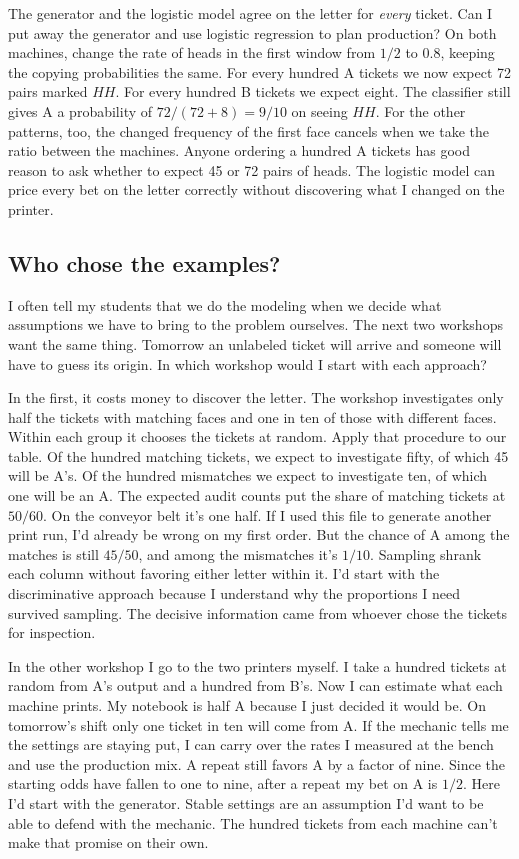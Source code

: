 \documentclass[12pt,oneside]{article}
\newcommand{\secao}[1]{\Needspace{5.2\baselineskip}\subsection*{#1}}
\newcommand{\bookanchor}[1]{\phantomsection\label{#1}}
\begin{document}
The generator and the logistic model agree on the letter for \emph{every} ticket. Can I put away the generator and use logistic regression to plan production? On both machines, change the rate of heads in the first window from $1/2$ to $0.8$, keeping the copying probabilities the same. For every hundred A tickets we now expect 72 pairs marked $HH$. For every hundred B tickets we expect eight. The classifier still gives A a probability of $72/(72+8)=9/10$ on seeing $HH$. For the other patterns, too, the changed frequency of the first face cancels when we take the ratio between the machines. Anyone ordering a hundred A tickets has good reason to ask whether to expect 45 or 72 pairs of heads. The logistic model can price every bet on the letter correctly without discovering what I changed on the printer.

\secao{Who chose the examples?}
I often tell my students that we do the modeling when we decide what assumptions we have to bring to the problem ourselves. The next two workshops want the same thing. Tomorrow an unlabeled ticket will arrive and someone will have to guess its origin. In which workshop would I start with each approach?

In\bookanchor{topic-05-3} the first, it costs money to discover the letter. The workshop investigates only half the tickets with matching faces and one in ten of those with different faces. Within each group it chooses the tickets at random. Apply that procedure to our table. Of the hundred matching tickets, we expect to investigate fifty, of which 45 will be A's. Of the hundred mismatches we expect to investigate ten, of which one will be an A. The expected audit counts put the share of matching tickets at $50/60$. On the conveyor belt it's one half. If I used this file to generate another print run, I'd already be wrong on my first order. But the chance of A among the matches is still $45/50$, and among the mismatches it's $1/10$. Sampling shrank each column without favoring either letter within it. I'd start with the discriminative approach because I understand why the proportions I need survived sampling. The decisive information came from whoever chose the tickets for inspection.

In\bookanchor{topic-05-5} the other workshop I go to the two printers myself. I take a hundred tickets at random from A's output and a hundred from B's. Now I can estimate what each machine prints. My notebook is half A because I just decided it would be. On tomorrow's shift only one ticket in ten will come from A. If the mechanic tells me the settings are staying put, I can carry over the rates I measured at the bench and use the production mix. A repeat still favors A by a factor of nine. Since the starting odds have fallen to one to nine, after a repeat my bet on A is $1/2$. Here I'd start with the generator. Stable settings are an assumption I'd want to be able to defend with the mechanic. The hundred tickets from each machine can't make that promise on their own.
\end{document}
